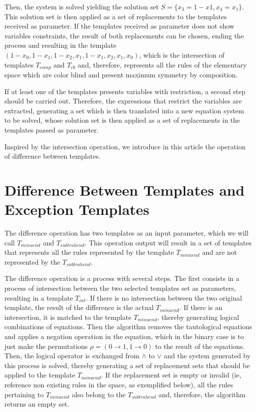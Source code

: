 \documentclass{llncs}
\begin{document}
Then, the system is solved yielding the solution set $S = \{x_3 = 1-x1, x_4 = x_1\}$. This solution set is then applied as a set of replacements to the templates received as parameter. If the templates received as parameter does not show variables constraints, the result of both replacements can be chosen, ending the process and resulting in the template $(1 - x_0, 1 - x_1, 1 - x_2, x_1, 1 - x_1, x_2, x_1, x_0)$, which is the intersection of templates $T_{comp}$ and $T_{cb}$ and, therefore, represents all the rules of the elementary space which are color blind and present maximum symmetry by composition.

If at least one of the templates presents variables with restriction, a second step should be carried out. Therefore, the expressions that restrict the variables are extracted, generating a set which is then translated into a new equation system to be solved, whose solution set is then applied as a set of replacements in the templates passed as parameter.

Inspired by the intersection operation, we introduce in this article the operation of difference between templates.

\section{Difference Between Templates and Exception Templates}
\label{sec:diferenca_entre_templates_e_templates_de_excecao}

The difference operation has two templates as an input parameter, which we will call $T_{minuend}$ and $T_{subtrahend}$. This operation output will result in a set of templates that represents all the rules represented by the template $T_{minuend}$ and are not represented by the $T_{subtrahend}$.

The difference operation is a process with several steps. The first consists in a process of intersection between the two selected templates set as parameters, resulting in a template $T_{int}$. If there is no intersection between the two original template, the result of the difference is the actual $T_{minuend}$. If there is an intersection, it is matched to the template $T_{minuend}$, thereby generating logical combinations of equations. Then the algorithm removes the tautological equations and applies a negation operation in the equation, which in the binary case is to just make the permutations $\rho = (0 \to 1, 1 \to 0)$ to the result of the equations. Then, the logical operator is exchanged from $\wedge$ to $\vee$ and the system generated by this process is solved, thereby generating a set of replacement sets that should be applied to the template $T_{minuend}$. If the replacement set is empty or invalid (ie, reference non existing rules in the space, as exemplified below), all the rules pertaining to $T_{minuend}$ also belong to the $T_{subtrahend}$ and, therefore, the algorithm returns an empty set.
\end{document}
